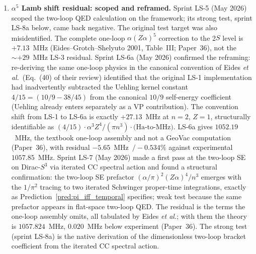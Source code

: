\documentclass[11pt]{article}
\begin{document}
\begin{enumerate}
\item \textbf{$\alpha^5$ Lamb shift residual: scoped and reframed.}
Sprint LS-5 (May 2026) scoped the two-loop QED calculation on the
framework; its strong test, sprint LS-8a below, came back negative.
The original test target was also misidentified.  The complete one-loop $\alpha(Z\alpha)^5$
correction to the 2$S$ level is $+7.13$~MHz (Eides--Grotch--Shelyuto
2001, Table~III; Paper~36), not the $\sim +29$~MHz LS-3 residual.  Sprint LS-6a (May 2026)
confirmed the reframing: re-deriving the same one-loop physics in the
canonical convention of Eides \emph{et al.}\ (Eq.~(40) of their review) identified that the original LS-1
implementation had inadvertently subtracted the Uehling kernel
constant $4/15 = (10/9 - 38/45)$ from the canonical $10/9$
self-energy coefficient (Uehling already enters separately as a VP
contribution).  The convention shift from LS-1 to LS-6a is exactly
$+27.13$~MHz at $n=2$, $Z=1$, structurally identifiable as $(4/15)
\cdot \alpha^3 Z^4 / (\pi n^3) \cdot \text{(Ha-to-MHz)}$.  LS-6a
gives $1052.19$~MHz, the textbook one-loop assembly and not a GeoVac
computation (Paper~36), with residual $-5.65$~MHz~$/-0.534\%$ against
experimental $1057.85$~MHz.  Sprint LS-7 (May 2026) made a first pass at
the two-loop SE on Dirac-$S^3$ via iterated CC spectral action and
found a structural confirmation: the two-loop
SE prefactor $(\alpha/\pi)^2 (Z\alpha)^4 / n^3$ emerges with the
$1/\pi^2$ tracing to two iterated Schwinger proper-time integrations,
exactly as Prediction~\ref{pred:pi_iff_temporal} specifies; weak test
because the same prefactor appears in flat-space two-loop QED.
The residual is the terms the one-loop assembly omits, all tabulated by Eides \emph{et al.}; with them the theory is $1057.824$~MHz, $0.020$~MHz below experiment (Paper~36).  The strong test (sprint LS-8a) is the native derivation of the
dimensionless two-loop bracket coefficient from the iterated CC
spectral action.


\end{enumerate}
\end{document}

